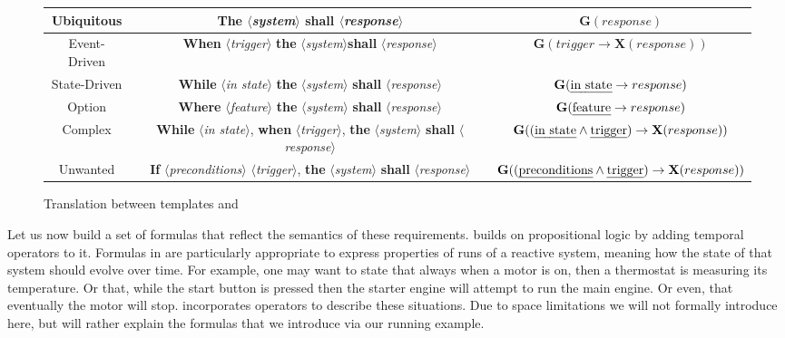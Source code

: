 \begin{figure}
\begin{tabular}{ |c|c|c| } 
 \hline
Ubiquitous & \textbf{The} $\langle$\emph{system}$\rangle$ \textbf{shall}
$\langle$\emph{response}$\rangle$ & $\mathbf{G}(response)$
\\
  \hline
Event-Driven & \textbf{When} $\langle$\emph{trigger}$\rangle$ \textbf{the}
$\langle$\emph{system}$\rangle$\textbf{shall} $\langle$\emph{response}$\rangle$
& $\mathbf{G}(trigger\rightarrow \textbf{X}(response))$
\\
 \hline 
State-Driven &  \textbf{While} $\langle$\emph{in state}$\rangle$ \textbf{the}
$\langle$\emph{system}$\rangle$ \textbf{shall} $\langle$\emph{response}$\rangle$
& $\mathbf{G}(\text{\emph{in state}}\rightarrow response)$ \\
 \hline

Option &  \textbf{Where} $\langle$\emph{feature}$\rangle$ \textbf{the}
$\langle$\emph{system}$\rangle$ \textbf{shall} $\langle$\emph{response}$\rangle$
& $\mathbf{G}(\text{\emph{feature}}\rightarrow response)$ \\
 \hline
 
Complex &  \textbf{While} $\langle$\emph{in state}$\rangle$, \textbf{when}
$\langle$\emph{trigger}$\rangle$, \textbf{the} $\langle$\emph{system}$\rangle$
\textbf{shall} $\langle$\emph{response}$\rangle$ & $\mathbf{G}((\text{\emph{in
state}} \land \text{\emph{trigger}})\rightarrow \textbf{X}(response))$ \\
 \hline
 
Unwanted &  \textbf{If} $\langle$\emph{preconditions}$\rangle$
$\langle$\emph{trigger}$\rangle$, \textbf{the} $\langle$\emph{system}$\rangle$
\textbf{shall} $\langle$\emph{response}$\rangle$ &
$\mathbf{G}((\text{\emph{preconditions}} \land \text{\emph{trigger}})\rightarrow
\textbf{X}(response))$ \\
 \hline
 
\end{tabular}
\caption{Translation between \ears templates and \ltl}
\label{fig:translation_ears_ltl}
\end{figure}

Let us now build a set of \ltl formulas that reflect the semantics of these
requirements. \ltl builds on propositional logic by adding temporal operators to
it. Formulas in \ltl are particularly appropriate to express properties of
runs of a reactive system, meaning how the state of that system should evolve
over time. For example, one may want to state that always when a motor is on,
then a thermostat is measuring its temperature. Or that, while the start button
is pressed then the starter engine will attempt to run the main engine. Or
even, that eventually the motor will stop. \ltl incorporates operators to
describe these situations. Due to space limitations we will not
formally introduce \ltl here, but will rather explain the formulas that we
introduce via our running example.


